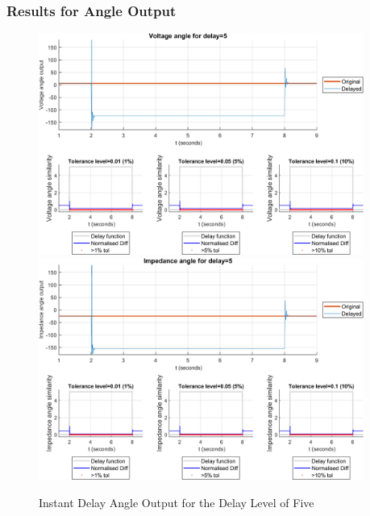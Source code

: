 \subsubsection{Results for Angle Output}


\begin{figure}
    \caption{Instant Delay Angle Output for the Delay Level of Five}
    \includegraphics[width=0.95\textwidth]{PMUsim-figures/DelayOf_5/Instant_vAngle.png}    
    \includegraphics[width=0.95\textwidth]{PMUsim-figures/DelayOf_5/Instant_iAngle.png}    
    \label{fig:PMUsim_Five_Angle}
        \begin{small}
     \end{small}
\end{figure}

